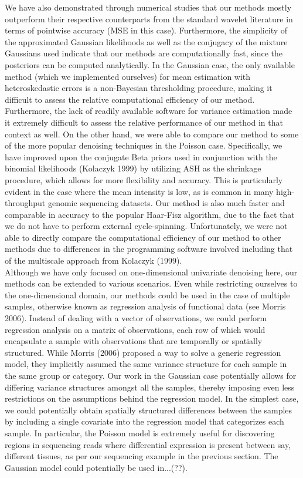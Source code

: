 \documentclass[12pt]{article}
\begin{document}
We have also demonstrated through numerical studies that our methods mostly outperform their respective counterparts from the standard wavelet literature in terms of pointwise accuracy (MSE in this case). Furthermore, the simplicity of the approximated Gaussian likelihoods as well as the conjugacy of the mixture Gaussians used indicate that our methods are computationally fast, since the posteriors can be computed analytically. In the Gaussian case, the only available method (which we implemented ourselves) for mean estimation with heteroskedastic errors is a non-Bayesian thresholding procedure, making it difficult to assess the relative computational efficiency of our method. Furthermore, the lack of readily available software for variance estimation made it extremely difficult to assess the relative performance of our method in that context as well. On the other hand, we were able to compare our method to some of the more popular denoising techniques in the Poisson case. Specifically, we have improved upon the conjugate Beta priors used in conjunction with the binomial likelihoods (Kolaczyk 1999) by utilizing ASH as the shrinkage procedure, which allows for more flexibility and accuracy. This is particularly evident in the case where the mean intensity is low, as is common in many high-throughput genomic sequencing datasets. Our method is also much faster and comparable in accuracy to the popular Haar-Fisz algorithm, due to the fact that we do not have to perform external cycle-spinning. Unfortunately, we were not able to directly compare the computational efficiency of our method to other methods due to differences in the programming software involved including that of the multiscale approach from Kolaczyk (1999).\bigskip\\
Although we have only focused on one-dimensional univariate denoising here, our methods can be extended to various scenarios. Even while restricting ourselves to the one-dimensional domain, our methods could be used in the case of multiple samples, otherwise known as regression analysis of functional data (see Morris 2006). Instead of dealing with a vector of observations, we could perform regression analysis on a matrix of observations, each row of which would encapsulate a sample with observations that are temporally or spatially structured. While Morris (2006) proposed a way to solve a generic regression model, they implicitly assumed the same variance structure for each sample in the same group or category. Our work in the Gaussian case potentially allows for differing variance structures amongst all the samples, thereby imposing even less restrictions on the assumptions behind the regression model. In the simplest case, we could potentially obtain spatially structured differences between the samples by including a single covariate into the regression model that categorizes each sample. In particular, the Poisson model is extremely useful for discovering regions in sequencing reads where differential expression is present between say, different tissues, as per our sequencing example in the previous section. The Gaussian model could potentially be used in...(??).\bigskip\\
\end{document}
